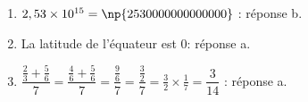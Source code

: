 
\medskip

%
%
%
%

\begin{enumerate}
\item $2,53 \times 10^{15} = \np{2530000000000000}$ : réponse b.
\item La latitude de l'équateur est $0$\degres : réponse a.
\item $\dfrac{\frac{2}{3} + \frac{5}{6}}{7} = \dfrac{\frac{4}{6} + \frac{5}{6}}{7} =\dfrac{\frac{9}{6}}{7}
= \dfrac{\frac{3}{2}}{7} = \frac{3}{2} \times \frac{1}{7} = \dfrac{3}{14}$ : réponse a.
\end{enumerate}

\vspace{0,5cm}

